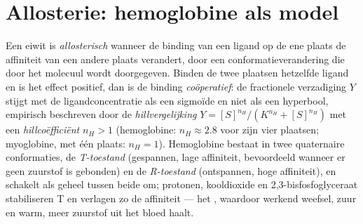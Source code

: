 \section{Allosterie: hemoglobine als model}

\begin{definition}\label{def:b3:structural-biology:allostery}
Een eiwit is \emph{allosterisch} wanneer de binding van een ligand op
de ene plaats de affiniteit van een andere plaats verandert, door een
conformatieverandering die door het molecuul wordt doorgegeven. Binden
de twee plaatsen hetzelfde ligand en is het effect positief, dan is de
binding \emph{coöperatief}: de fractionele verzadiging $Y$ stijgt met
de ligandconcentratie als een sigmoïde en niet als een hyperbool,
empirisch beschreven door de \emph{hillvergelijking}
$Y = [S]^{n_{H}}/(K^{n_{H}} +
[S]^{n_{H}})$ met een \emph{hillcoëfficiënt} $n_{H} > 1$ (hemoglobine:
$n_{H} \approx 2.8$ voor zijn vier plaatsen; myoglobine, met één
plaats: $n_{H} =
1$). Hemoglobine bestaat in twee quaternaire conformaties, de
\emph{T-toestand} (gespannen, lage affiniteit, bevoordeeld wanneer er
geen zuurstof is gebonden) en de \emph{R-toestand} (ontspannen, hoge
affiniteit), en schakelt als geheel tussen beide om; protonen,
kooldioxide en 2,3-bisfosfoglyceraat stabiliseren T en verlagen zo de
affiniteit --- het , waardoor werkend weefsel, zuur en warm,
meer zuurstof uit het bloed haalt.
\end{definition}

